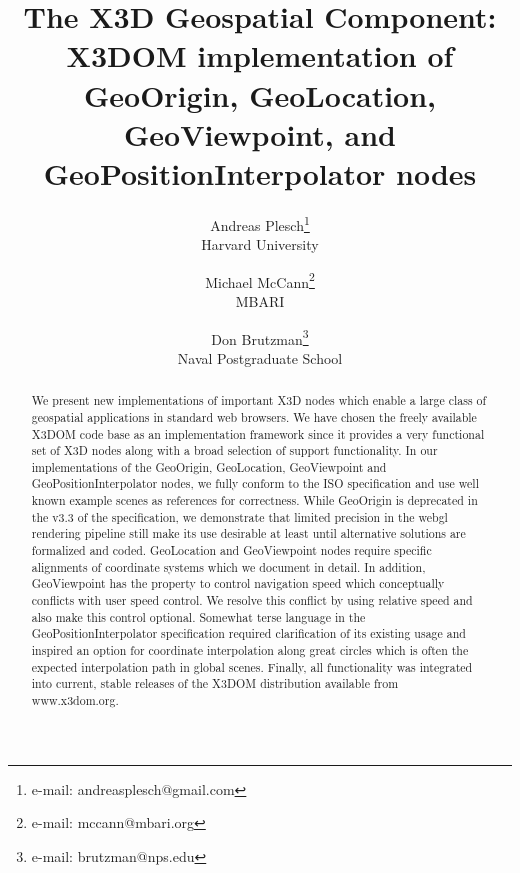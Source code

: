 \documentclass{acmsiggraph}                     %
\title{The X3D Geospatial Component: X3DOM implementation of GeoOrigin, GeoLocation, GeoViewpoint,
and GeoPositionInterpolator nodes}
\author{Andreas Plesch\thanks{e-mail: andreasplesch@gmail.com}\\Harvard University \and Michael
McCann\thanks{e-mail: mccann@mbari.org}\\MBARI \and Don Brutzman\thanks{e-mail:
brutzman@nps.edu}\\Naval Postgraduate School}
\begin{document}






\maketitle


\begin{abstract}

We present new implementations of important X3D nodes which enable a large class of geospatial
applications in standard web browsers. We have chosen the freely available X3DOM code base as an
implementation framework since it provides a very functional set of X3D nodes along with a broad
selection of support functionality. In our implementations of the GeoOrigin, GeoLocation,
GeoViewpoint and GeoPositionInterpolator nodes, we fully conform to the ISO specification and use
well known example scenes as references for correctness. While GeoOrigin is deprecated in the v3.3
of the specification, we demonstrate that limited precision in the webgl rendering pipeline still
make its use desirable at least until alternative solutions are formalized and coded. GeoLocation
and GeoViewpoint nodes require specific alignments of coordinate systems which we document in
detail. In addition, GeoViewpoint has the property to control navigation speed which conceptually
conflicts with user speed control. We resolve this conflict by using relative speed and also make
this control optional. Somewhat terse language in the GeoPositionInterpolator specification required
clarification of its existing usage and inspired an option for coordinate interpolation along great
circles which is often the expected interpolation path in global scenes. Finally, all functionality
was integrated into current, stable releases of the X3DOM distribution available from www.x3dom.org.

\end{abstract}
\end{document}
